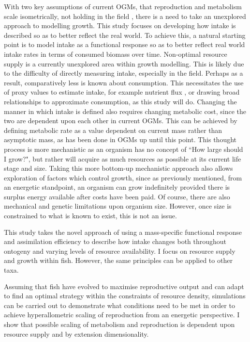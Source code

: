 \documentclass[a4paper, 11pt, hidelinks]{article} %
\begin{document}
	With two key assumptions of current OGMs, that reproduction and metabolism scale isometrically, not holding in the field \parencite{Peters1983, Barneche2018}, there is a need to take an unexplored approach to modelling growth.  This study focuses on developing how intake is described so as to better reflect the real world.  To achieve this, a natural starting point is to model intake as a functional response \parencite{Holling1959} so as to better reflect real world intake rates in terms of consumed biomass over time.  Non-optimal resource supply is a currently unexplored area within growth modelling.  This is likely due to the difficulty of directly measuring intake, especially in the field. Perhaps as a result, comparatively less is known about consumption.  This necessitates the use of proxy values to estimate intake, for example nutrient flux \parencite{Schiettekatte2020}, or drawing broad relationships to approximate consumption, as this study will do.
	Changing the manner in which intake is defined also requires changing metabolic cost, since the two are dependent upon each other in current OGMs.  This can be achieved by defining metabolic rate as a value dependent on current mass rather than asymptotic mass, as has been done in OGMs up until this point.  This thought process is more mechanistic as an organism has no concept of ``How large should I grow?", but rather will acquire as much resources as possible at its current life stage and size.  Taking this more bottom-up mechanistic approach also allows exploration of factors which control growth, since as previously mentioned, from an energetic standpoint, an organism can grow indefinitely provided there is surplus energy available after costs have been paid.  Of course, there are also mechanical and genetic limitations upon organism size. However, once size is constrained to what is known to exist, this is not an issue.  
	
	This study takes the novel approach of using a mass-specific functional response and assimilation efficiency to describe how intake changes both throughout ontogeny and varying levels of resource availability. I focus on resource supply and growth within fish. However, the same principles can be applied to other taxa.
	
	Assuming that fish have evolved to maximise reproductive output and can adapt to find an optimal strategy within the constraints of resource density, simulations can be carried out to demonstrate what conditions need to be met in order to achieve hyperallometric scaling of reproduction from an energetic perspective.  I show that possible scaling of metabolism and reproduction is dependent upon resource supply and by extension dimensionality.
\end{document}
